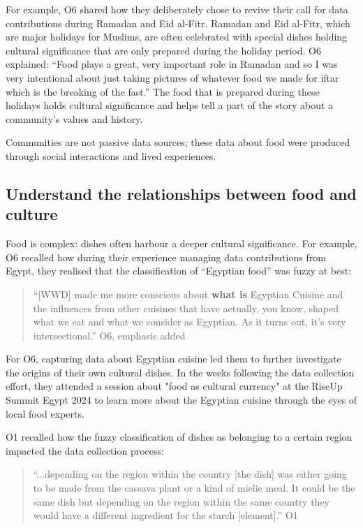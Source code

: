 For example, O6 shared how they deliberately chose to revive their call for data contributions during Ramadan and Eid al-Fitr. Ramadan and Eid al-Fitr, which are major holidays for Muslims, are often celebrated with special dishes holding cultural significance that are only prepared during the holiday period. O6 explained: ``Food plays a great, very important role in Ramadan and so I was very intentional about just taking pictures of whatever food we made for iftar which is the breaking of the fast.'' The food that is prepared during these holidays holds cultural significance and helps tell a part of the story about a community's values and history. 

Communities are not passive data sources; these data about food were produced through social interactions and lived experiences. 

\subsection{Understand the relationships between food and culture}

Food is complex: dishes often harbour a deeper cultural significance. For example, O6 recalled how during their experience managing data contributions from Egypt, they realised that the classification of ``Egyptian food'' was fuzzy at best:
\begin{quote}
    ``[WWD] made me more conscious about \textbf{what is} Egyptian Cuisine and the influences from other cuisines that have actually, you know, shaped what we eat and what we consider as Egyptian. As it turns out, it's very intersectional.'' O6, emphasis added
\end{quote}
For O6, capturing data about Egyptian cuisine led them to further investigate the origins of their own cultural dishes. In the weeks following the data collection effort, they attended a session about "food as cultural currency" at the RiseUp Summit Egypt 2024 to learn more about the Egyptian cuisine through the eyes of local food experts.

O1 recalled how the fuzzy classification of dishes as belonging to a certain region impacted the data collection process:
\begin{quote}
    ``...depending on the region within the country [the dish] was either going to be made from the cassava plant or a kind of mielie meal. It could be the same dish but depending on the region within the same country they would have a different ingredient for the starch [element].'' O1
\end{quote}

